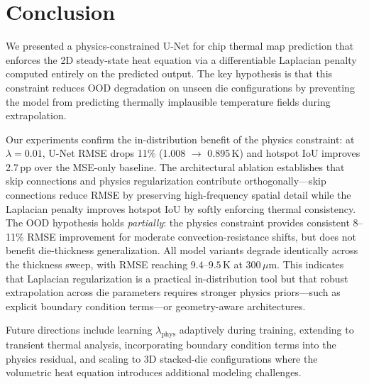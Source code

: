 \documentclass[10pt,twocolumn,letterpaper]{article}
\begin{document}
\section{Conclusion}

We presented a physics-constrained U-Net for chip thermal map
prediction that enforces the 2D steady-state heat equation via a
differentiable Laplacian penalty computed entirely on the predicted
output. The key hypothesis is that this constraint reduces OOD
degradation on unseen die configurations by preventing the model
from predicting thermally implausible temperature fields during
extrapolation.

Our experiments confirm the in-distribution benefit of the physics
constraint: at $\lambda{=}0.01$, U-Net RMSE drops 11\% (1.008
$\to$ 0.895\,K) and hotspot IoU improves 2.7\,pp over the MSE-only
baseline. The architectural ablation establishes that skip connections
and physics regularization contribute orthogonally---skip connections
reduce RMSE by preserving high-frequency spatial detail while the
Laplacian penalty improves hotspot IoU by softly enforcing thermal
consistency. The OOD hypothesis holds \emph{partially}: the physics
constraint provides consistent 8--11\% RMSE improvement for moderate
convection-resistance shifts, but does not benefit die-thickness
generalization. All model variants degrade identically across the
thickness sweep, with RMSE reaching $9.4$--$9.5$\,K at 300\,$\mu$m.
This indicates that Laplacian regularization is a practical in-distribution
tool but that robust extrapolation across die parameters requires
stronger physics priors---such as explicit boundary condition terms---or
geometry-aware architectures.

Future directions include learning $\lambda_\text{phys}$ adaptively
during training, extending to transient thermal analysis, incorporating
boundary condition terms into the physics residual, and scaling to
3D stacked-die configurations where the volumetric heat equation
introduces additional modeling challenges.


{\small


}
\end{document}
